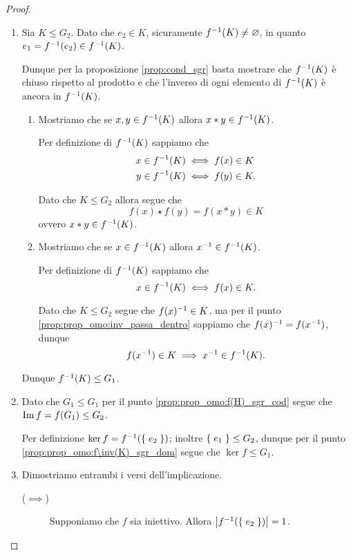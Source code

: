 \begin{proof}
\begin{enumerate}[label={(\roman*)}]
\begin{enumerate}[label={(\arabic*)}]
            Dunque $f(h\inv) \in f(H)$, ma per il punto \ref{prop:prop_omo:inv_passa_dentro} sappiamo che \[
                f(h\inv) = f(h)\inv = x\inv \in f(H).   
            \]
        \end{enumerate}
        Dunque $f(H) \leq G_2$.
        \item Sia $K \leq G_2$. Dato che $e_2 \in K$, sicuramente $f\inv(K) \neq \varnothing$, in quanto $e_1 = f\inv(e_2) \in f\inv(K)$.
        
        Dunque per la proposizione \ref{prop:cond_sgr} basta mostrare che $f\inv(K)$ è chiuso rispetto al prodotto e che l'inverso di ogni elemento di $f\inv(K)$ è ancora in $f\inv(K)$.

        \begin{enumerate}[label={(\arabic*)}]
            \item Mostriamo che se $x, y \in f\inv(K)$ allora $x* y \in f\inv(K)$.
            
            Per definizione di $f\inv(K)$ sappiamo che \begin{align*}
                x \in f\inv(K) &\iff f(x) \in K \\
                y \in f\inv(K) &\iff f(y) \in K.
            \end{align*}
            
            Dato che $K \leq G_2$ allora segue che \[
                f(x) \star f(y) = f(x * y) \in K     
            \] ovvero $x * y \in f\inv(K)$.
            \item Mostriamo che se $x \in f\inv(K)$ allora $x\inv \in f\inv(K)$.
            
            Per definizione di $f\inv(K)$ sappiamo che \[
                x \in f\inv(K) \iff f(x) \in K.    
            \] 
            
            Dato che $K \leq G_2$ segue che $f(x)\inv \in K$, ma per il punto \ref{prop:prop_omo:inv_passa_dentro} sappiamo che $f(x)\inv = f(x\inv)$, dunque \[
                f(x\inv) \in K \implies x\inv \in f\inv(K).  
            \]
        \end{enumerate}
        Dunque $f\inv(K) \leq G_1$.
        \item Dato che $G_1 \leq G_1$ per il punto \ref{prop:prop_omo:f(H)_sgr_cod} segue che $\Imm f = f(G_1) \leq G_2$.
        
        Per definizione $\ker f = f\inv(\set{e_2})$; inoltre $\set{e_1} \leq G_2$, dunque per il punto \ref{prop:prop_omo:f\inv(K)_sgr_dom} segue che $\ker f \leq G_1$.
        \item Dimostriamo entrambi i versi dell'implicazione.
        \begin{description}
            \item[($\implies$)] Supponiamo che $f$ sia iniettivo. Allora $\abs*{f\inv(\set{e_2})} = 1$.
            

\end{description}
\end{enumerate}
\end{proof}
